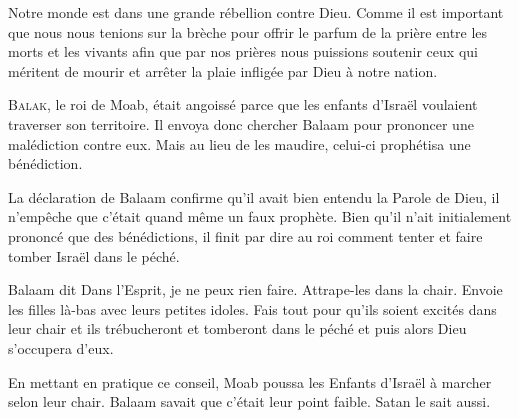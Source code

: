 Notre monde est dans une grande rébellion contre Dieu.
 Comme il est important que nous nous tenions sur la brèche
 pour offrir le parfum de la prière entre les morts et les vivants
 \ocadr{}afin que par nos prières nous puissions soutenir
 ceux qui méritent de mourir et arrêter la plaie infligée
 par Dieu à notre nation. 

\dvrule







\lettrine{B}{alak}, le roi de Moab, était angoissé parce que
 les enfants d'Israël voulaient traverser son territoire.
 Il envoya donc chercher Balaam pour prononcer une malédiction contre eux.
 Mais au lieu de les maudire, celui-ci prophétisa une bénédiction.

La déclaration de Balaam confirme qu'il avait bien entendu la Parole de Dieu,
 il n'empêche que c'était quand même un faux prophète.
 Bien qu'il n'ait initialement prononcé que des bénédictions,
 il finit par dire au roi comment tenter et faire tomber Israël dans le péché.

Balaam dit\frcolon{}
 \Og Dans l'Esprit, je ne peux rien faire. Attrape-les dans la chair.
 Envoie les filles là-bas avec leurs petites idoles.
 Fais tout pour qu'ils soient excités dans leur chair
 et ils trébucheront et tomberont dans le péché
 \ocadr{}et puis alors Dieu s'occupera d'eux. \Fg{}

En mettant en pratique ce conseil, Moab poussa les Enfants d'Israël
 à marcher selon leur chair.
 Balaam savait que c'était leur point faible. Satan le sait aussi.

